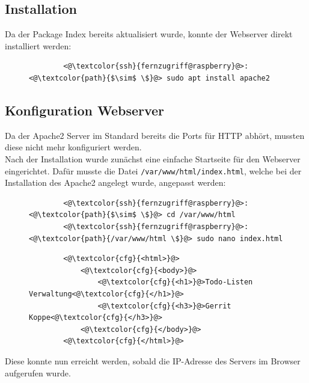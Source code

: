 \documentclass[a4paper, 11pt]{scrartcl}
\begin{document}
\subsection{Installation}
Da der Package Index bereits aktualisiert wurde, konnte der Webserver direkt installiert werden:
\begin{figure}[H]
    \begin{mdframed}[backgroundcolor=bbg]
        \begin{lstlisting}
        <@\textcolor{ssh}{fernzugriff@raspberry}@>:<@\textcolor{path}{$\sim$ \$}@> sudo apt install apache2
        \end{lstlisting}
    \end{mdframed}
    \label{lst:apache_install}
\end{figure}


\subsection{Konfiguration Webserver}
Da der Apache2 Server im Standard bereits die Ports für HTTP abhört, mussten diese nicht mehr konfiguriert werden.
\\
Nach der Installation wurde zunächst eine einfache Startseite für den Webserver eingerichtet. Dafür musste die Datei
\lstinline[basicstyle={\small\ttfamily\color{black}}]|/var/www/html/index.html|, welche bei der Installation des Apache2 angelegt wurde, angepasst
werden:
\begin{figure}[H]
    \begin{mdframed}[backgroundcolor=bbg]
        \begin{lstlisting}
        <@\textcolor{ssh}{fernzugriff@raspberry}@>:<@\textcolor{path}{$\sim$ \$}@> cd /var/www/html
        <@\textcolor{ssh}{fernzugriff@raspberry}@>:<@\textcolor{path}{/var/www/html \$}@> sudo nano index.html
        \end{lstlisting}
    \end{mdframed}
    \label{lst:index_nano}
\end{figure}
\begin{figure}[H]
    \begin{mdframed}[backgroundcolor=bbg]
        \begin{lstlisting}
        <@\textcolor{cfg}{<html>}@>
            <@\textcolor{cfg}{<body>}@>
                <@\textcolor{cfg}{<h1>}@>Todo-Listen Verwaltung<@\textcolor{cfg}{</h1>}@>
                <@\textcolor{cfg}{<h3>}@>Gerrit Koppe<@\textcolor{cfg}{</h3>}@>
            <@\textcolor{cfg}{</body>}@>
        <@\textcolor{cfg}{</html>}@>
        \end{lstlisting}
    \end{mdframed}
    \label{lst:index_apache2}
\end{figure}
Diese konnte nun erreicht werden, sobald die IP-Adresse des Servers im Browser aufgerufen wurde.
\end{document}
